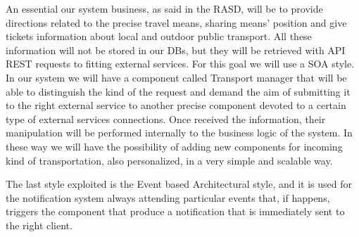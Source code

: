 An essential our system business, as said in the RASD, will be to provide directions related to the precise travel means, sharing means’ position and give tickets information about local and outdoor public transport. All these information will not be stored in our DBs, but they will be retrieved with API REST requests to fitting external services. For this goal we will use a SOA style. 
In our system we will have a component called Transport manager that will be able to distinguish the kind of the request and demand the aim of submitting it to the right external service to another precise component devoted to a certain type of external services connections. Once received the information, their manipulation will be performed internally to the business logic of the system. In these way we will have the possibility of adding new components for incoming kind of transportation, also personalized, in a very simple and scalable way.

The last style exploited is the Event based Architectural style, and it is used for the notification system always attending particular events that, if happens, triggers the component that produce a notification that is immediately sent to the right client. 


